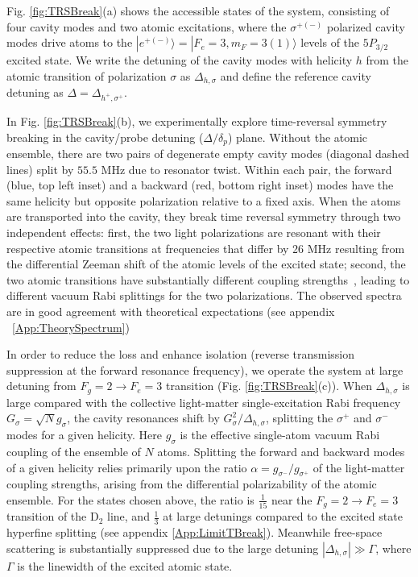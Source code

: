 \documentclass[aps,pra,twocolumn,groupedaddress,10pt,showpacs]{revtex4-1}
\begin{document}
Fig. \ref{fig:TRSBreak}(a) shows the accessible states of the system, consisting of four cavity modes and two atomic excitations, where the $\sigma^{+(-)}$ polarized cavity modes drive atoms to the $|e^{+(-)}\rangle = |F_e=3,m_F=3(1)\rangle$ levels of the $5P_{3/2}$ excited state. We write the detuning of the cavity modes with helicity $h$ from the atomic transition of polarization $\sigma$ as $\Delta_{h,\sigma}$ and define the reference cavity detuning as $\Delta=\Delta_{h^+,\sigma^+}$.

In Fig. \ref{fig:TRSBreak}(b), we experimentally explore time-reversal symmetry breaking in the cavity/probe detuning ($\Delta/\delta_p$) plane. Without the atomic ensemble, there are two pairs of degenerate empty cavity modes (diagonal dashed lines) split by $55.5$ MHz due to resonator twist. Within each pair, the forward (blue, top left inset) and a backward (red, bottom right inset) modes have the same helicity but opposite polarization relative to a fixed axis. When the atoms are transported into the cavity, they break time reversal symmetry through two independent effects: first, the two light polarizations are resonant with their respective atomic transitions at frequencies that differ by 26 MHz resulting from the differential Zeeman shift of the atomic levels of the excited state; second, the two atomic transitions have substantially different coupling strengths~\cite{steck2001rubidium}, leading to different vacuum Rabi splittings for the two polarizations. The observed spectra are in good agreement with theoretical expectations (see appendix ~\ref{App:TheorySpectrum})

In order to reduce the loss and enhance isolation (reverse transmission suppression at the forward resonance frequency), we operate the system at large detuning from $F_g=2 \rightarrow F_e=3$ transition (Fig. \ref{fig:TRSBreak}(c)). When $\Delta_{h,\sigma}$ is large compared with the collective light-matter single-excitation Rabi frequency $G_{\sigma}=\sqrt{N}g_{\sigma}$, the cavity resonances shift by $G_{\sigma}^2/\Delta_{h,\sigma}$, splitting the $\sigma^+$ and $\sigma^-$ modes for a given helicity. Here $g_{\sigma}$ is the effective single-atom vacuum Rabi coupling of the ensemble of $N$ atoms.  Splitting the forward and backward modes of a given helicity relies primarily upon the ratio $\alpha=g_{\sigma^-}/g_{\sigma^+}$ of the light-matter coupling strengths, arising from the differential polarizability of the atomic ensemble. For the states chosen above, the ratio is $\frac{1}{15}$ near the $F_g=2\rightarrow F_e=3$ transition of the D$_2$ line, and $\frac{1}{3}$ at large detunings compared to the excited state hyperfine splitting (see appendix \ref{App:LimitTBreak}). Meanwhile free-space scattering is substantially suppressed due to the large detuning $|\Delta_{h,\sigma}| \gg \Gamma$, where $\Gamma$ is the linewidth of the excited atomic state. 
\end{document}
